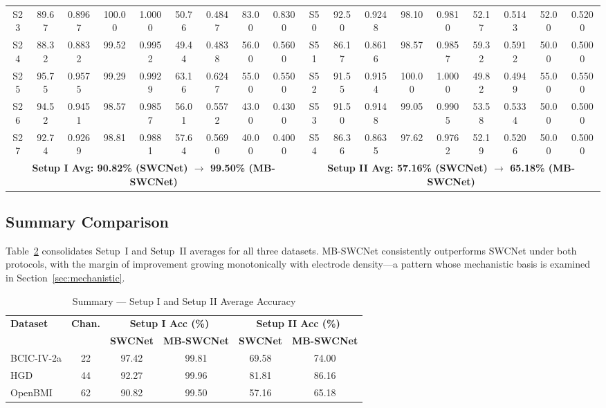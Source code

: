 \documentclass[conference]{IEEEtran}
\begin{document}
\begin{table}[t]
\begin{center}
{\begin{tabular}{|c|cc|cc||cc|cc||c|cc|cc||cc|cc|}
S23 & 89.67 & 0.8967 & 100.00 & 1.0000 & 50.76 & 0.4847 & 83.00 & 0.8300 &
S50 & 92.50 & 0.9248 & 98.10 & 0.9810 & 52.17 & 0.5143 & 52.00 & 0.5200 \\
S24 & 88.32 & 0.8832 & 99.52 & 0.9952 & 49.44 & 0.4838 & 56.00 & 0.5600 &
S51 & 86.17 & 0.8616 & 98.57 & 0.9857 & 59.32 & 0.5912 & 50.00 & 0.5000 \\
S25 & 95.75 & 0.9575 & 99.29 & 0.9929 & 63.16 & 0.6247 & 55.00 & 0.5500 &
S52 & 91.55 & 0.9154 & 100.00 & 1.0000 & 49.82 & 0.4949 & 55.00 & 0.5500 \\
S26 & 94.52 & 0.9451 & 98.57 & 0.9857 & 56.01 & 0.5572 & 43.00 & 0.4300 &
S53 & 91.50 & 0.9148 & 99.05 & 0.9905 & 53.58 & 0.5334 & 50.00 & 0.5000 \\
S27 & 92.74 & 0.9269 & 98.81 & 0.9881 & 57.64 & 0.5690 & 40.00 & 0.4000 &
S54 & 86.36 & 0.8635 & 97.62 & 0.9762 & 52.19 & 0.5206 & 50.00 & 0.5000 \\
\hline
\multicolumn{9}{|c||}{\textbf{Setup I Avg: 90.82\% (SWCNet) $\rightarrow$ 99.50\% (MB-SWCNet)}} &
\multicolumn{9}{c|}{\textbf{Setup II Avg: 57.16\% (SWCNet) $\rightarrow$ 65.18\% (MB-SWCNet)}} \\
\hline
\end{tabular}%
}
\label{tab:openbmi_combined}
\end{center}
\end{table}

\subsection{Summary Comparison}

Table~\ref{tab:combined_summary} consolidates Setup~I and Setup~II averages for all three datasets. MB-SWCNet consistently outperforms SWCNet under both protocols, with the margin of improvement growing monotonically with electrode density---a pattern whose mechanistic basis is examined in Section~\ref{sec:mechanistic}.

\begin{table}[h]
\caption{Summary --- Setup I and Setup II Average Accuracy}
\begin{center}
\setlength{\tabcolsep}{4pt}
\begin{tabular}{|l|c|c|c|c|c|}
\hline
\multirow{2}{*}{\textbf{Dataset}} & \multirow{2}{*}{\textbf{Chan.}} &
\multicolumn{2}{c|}{\textbf{Setup I Acc (\%)}} &
\multicolumn{2}{c|}{\textbf{Setup II Acc (\%)}} \\
\cline{3-6}
& & \textbf{SWCNet} & \textbf{MB-SWCNet} & \textbf{SWCNet} & \textbf{MB-SWCNet} \\
\hline
BCIC-IV-2a & 22 & 97.42 & 99.81 & 69.58 & 74.00 \\
\hline
HGD        & 44 & 92.27 & 99.96 & 81.81 & 86.16 \\
\hline
OpenBMI    & 62 & 90.82 & 99.50 & 57.16 & 65.18 \\
\hline
\end{tabular}
\label{tab:combined_summary}
\end{center}
\end{table}
\end{document}
